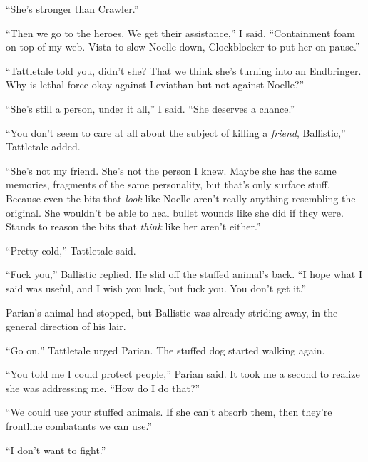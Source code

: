``She's stronger than Crawler.''



``Then we go to the heroes.  We get their assistance,'' I said.  ``Containment foam on top of my web.  Vista to slow Noelle down, Clockblocker to put her on pause.''



``Tattletale told you, didn't she?  That we think she's turning into an Endbringer.  Why is lethal force okay against Leviathan but not against Noelle?''



``She's still a person, under it all,'' I said.  ``She deserves a chance.''



``You don't seem to care at all about the subject of killing a \emph{friend}, Ballistic,'' Tattletale added.



``She's not my friend.  She's not the person I knew.  Maybe she has the same memories, fragments of the same personality, but that's only surface stuff.  Because even the bits that \emph{look} like Noelle aren't really anything resembling the original.  She wouldn't be able to heal bullet wounds like she did if they were.  Stands to reason the bits that \emph{think} like her aren't either.''



``Pretty cold,'' Tattletale said.



``Fuck you,'' Ballistic replied.  He slid off the stuffed animal's back.  ``I hope what I said was useful, and I wish you luck, but fuck you.  You don't get it.''



Parian's animal had stopped, but Ballistic was already striding away, in the general direction of his lair.



``Go on,'' Tattletale urged Parian.  The stuffed dog started walking again.



``You told me I could protect people,'' Parian said.  It took me a second to realize she was addressing me.  ``How do I do that?''



``We could use your stuffed animals.  If she can't absorb them, then they're frontline combatants we can use.''



``I don't want to fight.''




